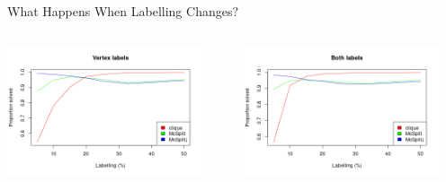 \documentclass{beamer}
\begin{document}
\begin{frame}{What Happens When Labelling Changes?}
  \begin{columns}
    \begin{column}{0.5\textwidth}
      \centering
      \includegraphics[width=0.9\textwidth]{../dissertation/images/vertex_labels_linechart.png}
    \end{column}
    \begin{column}{0.5\textwidth}
      \centering
      \includegraphics[width=0.9\textwidth]{../dissertation/images/both_labels_linechart.png}

\end{column}
\end{columns}
\end{frame}
\end{document}
